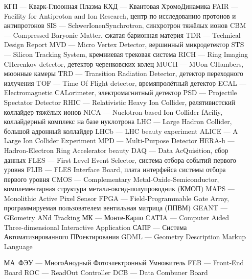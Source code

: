КГП --- Кварк-Глюонная Плазма
КХД --- Квантовая ХромоДинамика
FAIR --- Facility for Antiproton and Ion Research, центр по исследованию протонов и антипротонов
SIS --- SchwerIonenSynchrotron, синхротрон тяжёлых ионов
CBM --- Compressed Baryonic Matter, сжатая барионная материя
TDR --- Technical Design Report
MVD --- Micro Vertex Detector, вершинный микродетектор
STS --- Silicon Tracking System, кремниевая трековая система
RICH --- Ring Imaging CHerenkov detector, детектор черенковских колец
MUCH --- MUon CHambers, мюонные камеры
TRD --- Transition Radiation Detector, детектор переходного излучения
TOF --- Time Of Flight detector, времяпролётный детектор
ECAL --- Electromagnetic CALorimeter, электромагнитный детектор
PSD --- Projectile Spectator Detector
RHIC --- Relativistic Heavy Ion Collider, релятивистский коллайдер тяжёлых ионов
NICA --- Nuclotron-based Ion Collider fAciliy, коллайдерный комплекс на базе нуклотрона
LHC --- Large Hadron Collider, большой адронный коллайдер
LHCb --- LHC beauty experiment
ALICE --- A Large Ion Collider Experiment
MPD --- Multi-Purpose Detector
HERA-b --- Hadron-Electron Ring Accelerator beauty
DAQ --- Data AcQuisition, сбор данных
FLES --- First Level Event Selector, система отбора событий первого уровня
FLIB --- FLES Interface Board, плата интерфейса системы отбора первого уровня
CMOS --- Complementary Metal-Oxide-Semiconductor, комплементарная структура металл-оксид-полупроводник (КМОП)
MAPS --- Monolithic Active Pixel Sensor
FPGA --- Field-Programmable Gate Array, программируемая пользователем вентильная матрица (ППВМ)
GEANT --- GEometry ANd Tracking
МК --- Монте-Карло
CATIA --- Computer Aided Three-dimensional Interactive Application
САПР --- Система Автоматизированного ПРоектирования
GDML --- Geometry Description Markup Language

МА~ФЭУ --- МногоАнодный Фотоэлектронный Умножитель
FEB --- Front-End Board
ROC --- ReadOut Controller
DCB --- Data Combuner Board

